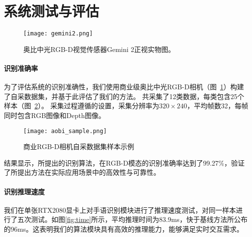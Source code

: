 \section{系统测试与评估}
\begin{figure}
    \centering
    \texttt{[image: gemini2.png]}
    \caption{奥比中光RGB-D视觉传感器Gemini 2正视实物图。}
    \label{fig:aobi_robot}
  \end{figure}
\paragraph{识别准确率}
为了评估系统的识别准确性，我们使用商业级奥比中光RGB-D相机（图~\ref{fig:aobi_robot}）构建了自采数据集，并基于此评估了我们的方法。%
共采集了12类数据，每类包含25个样本（图~\ref{fig:aobi_sample}）。%
采集过程遵循\cite{wan2016chalearn}的设置，采集分辨率为$320\times240$，平均帧数32，每帧同时包含RGB图像和Depth图像。

\begin{figure}
    \centering
    \texttt{[image: aobi\_sample.png]}
    \caption{商业RGB-D相机自采数据集样本示例}
    \label{fig:aobi_sample}
  \end{figure}

结果显示，所提出的识别算法，在RGB-D模态的识别准确率达到了99.27\%，验证了所提出方法在实际应用场景中的高效性与可靠性。

\paragraph{识别推理速度}
我们在单张RTX2080显卡上对手语识别模块进行了推理速度测试，对同一样本进行了五次测试。如图\ref{fig:time}所示，平均推理时间为83.9ms，快于基线方法\cite{范桂双2020基于S3D}所公布的96ms。这表明我们的算法模块具有高效的推理能力，能够满足实时交互需求。

